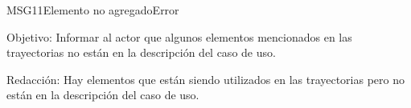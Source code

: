 \begin{mensaje}{MSG11}{Elemento no agregado}{Error}
	\item [Objetivo:] Informar al actor que algunos elementos mencionados en las trayectorias no están en la descripción del caso de uso.
	\item[Redacción:] Hay elementos que están siendo utilizados en las trayectorias pero no están en la descripción del caso de uso.
\end{mensaje}